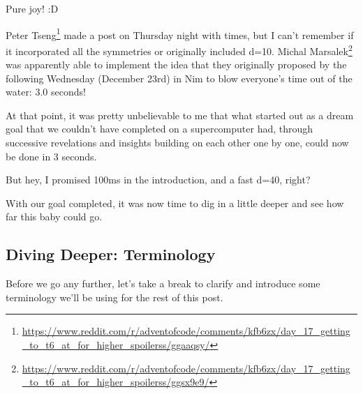 \documentclass[]{article}
\renewcommand{\href}[2]{#2\footnote{\url{#1}}}
\begin{document}
Pure joy! :D

\href{https://www.reddit.com/r/adventofcode/comments/kfb6zx/day_17_getting_to_t6_at_for_higher_spoilerss/ggaaqsy/}{Peter
Tseng} made a post on Thursday night with times, but I can't remember if it
incorporated all the symmetries or originally included d=10.
\href{https://www.reddit.com/r/adventofcode/comments/kfb6zx/day_17_getting_to_t6_at_for_higher_spoilerss/ggsx9e9/}{Michal
Marsalek} was apparently able to implement the idea that they originally
proposed by the following Wednesday (December 23rd) in Nim to blow everyone's
time out of the water: 3.0 seconds!

At that point, it was pretty unbelievable to me that what started out as a dream
goal that we couldn't have completed on a supercomputer had, through successive
revelations and insights building on each other one by one, could now be done in
3 seconds.

But hey, I promised 100ms in the introduction, and a fast d=40, right?

With our goal completed, it was now time to dig in a little deeper and see how
far this baby could go.

\hypertarget{diving-deeper-terminology}{%
\subsection{Diving Deeper: Terminology}\label{diving-deeper-terminology}}

Before we go any further, let's take a break to clarify and introduce some
terminology we'll be using for the rest of this post.
\end{document}
